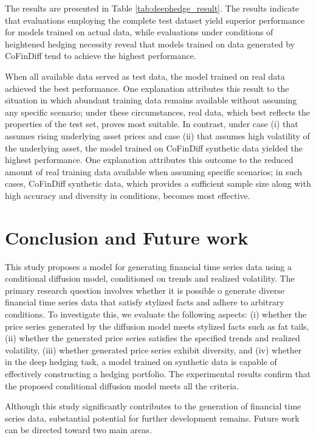 \documentclass{article}
\begin{document}
The results are presented in Table \ref{tab:deephedge_result}. 
The results indicate that evaluations employing the complete test dataset yield superior performance for models trained on actual data, while evaluations under conditions of heightened hedging necessity reveal that models trained on data generated by CoFinDiff tend to achieve the highest performance.

When all available data served as test data, the model trained on real data achieved the best performance. One explanation attributes this result to the situation in which abundant training data remains available without assuming any specific scenario; under these circumstances, real data, which best reflects the properties of the test set, proves most suitable. In contrast, under case (i) that assumes rising underlying asset prices and case (ii) that assumes high volatility of the underlying asset, the model trained on CoFinDiff synthetic data yielded the highest performance. One explanation attributes this outcome to the reduced amount of real training data available when assuming specific scenarios; in such cases, CoFinDiff synthetic data, which provides a sufficient sample size along with high accuracy and diversity in conditions, becomes most effective.

\section{Conclusion and Future work}

This study proposes a model for generating financial time series data using a conditional diffusion model, conditioned on trends and realized volatility. The primary research question involves whether it is possible o generate diverse financial time series data that satisfy stylized facts and adhere to arbitrary conditions. To investigate this, we evaluate the following aspects: (i) whether the price series generated by the diffusion model meets stylized facts such as fat tails, (ii) whether the generated price series satisfies the specified trends and realized volatility, (iii) whether generated price series exhibit diversity, and (iv) whether in the deep hedging task, a model trained on synthetic data is capable of effectively constructing a hedging portfolio.
The experimental results confirm that the proposed conditional diffusion model meets all the criteria.

Although this study significantly contributes to the generation of financial time series data, substantial potential for further development remains. Future work can be directed toward two main areas.
\end{document}
